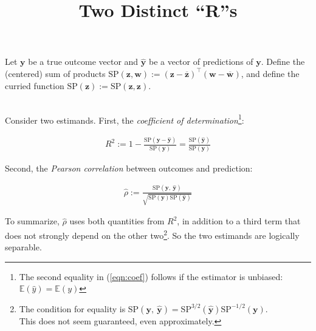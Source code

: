 \documentclass{article}
\title{Two Distinct ``R''s}
\author{}
\date{}
\begin{document}
\maketitle

Let $\mathbf{y}$ be a true outcome vector and $\widehat{\mathbf{y}}$ be a vector of predictions of $\mathbf{y}$. Define the (centered) sum of products $\text{SP}(\mathbf{z}, \mathbf{w}) := (\mathbf{z}-\overline{\mathbf{z}})^\top(\mathbf{w}-\overline{\mathbf{w}})$, and define the curried function $\text{SP}(\mathbf{z}) := \text{SP}(\mathbf{z}, \mathbf{z})$.

\ \\

Consider two estimands. First, the \emph{coefficient of determination}\footnote{The second equality in (\ref{eqn:coef}) follows if the estimator is unbiased: $\mathbb{E}(\widehat{y}) = \mathbb{E}(y)$}:

\begin{align}
    R^2 := 1 - \frac{\text{SP}(\mathbf{y}-\widehat{\mathbf{y}})}{\text{SP}(\mathbf{y})} = \frac{\text{SP}(\widehat{\mathbf{y}})}{\text{SP}(\mathbf{y})} \label{eqn:coef}
\end{align}

Second, the \emph{Pearson correlation} between outcomes and prediction:

\begin{align}
    \widehat{\rho} := \frac{\text{SP}(\mathbf{y},\  \widehat{\mathbf{y}})}{\sqrt{\text{SP}(\mathbf{y})\text{SP}(\widehat{\mathbf{y}})}}
\end{align}


To summarize, $\widehat{\rho}$ uses both quantities from $R^2$, in addition to a third term that does not strongly depend on the other two\footnote{The condition for equality is $\text{SP}(\mathbf{y},\  \widehat{\mathbf{y}}) = \text{SP}^{3/2}(\widehat{\mathbf{y}})\text{SP}^{-1/2}(\mathbf{y})$. \\This does not seem guaranteed, even approximately.}. So the two estimands are logically separable.
\end{document}
